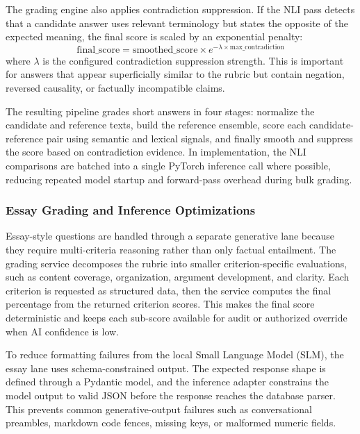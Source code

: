 The grading engine also applies contradiction suppression. If the NLI pass detects that a candidate answer uses relevant terminology but states the opposite of the expected meaning, the final score is scaled by an exponential penalty:
\[
\text{final\_score} =
\text{smoothed\_score} \times
e^{-\lambda \times \text{max\_contradiction}}
\]
where \(\lambda\) is the configured contradiction suppression strength. This is important for answers that appear superficially similar to the rubric but contain negation, reversed causality, or factually incompatible claims.

The resulting pipeline grades short answers in four stages: normalize the candidate and reference texts, build the reference ensemble, score each candidate-reference pair using semantic and lexical signals, and finally smooth and suppress the score based on contradiction evidence. In implementation, the NLI comparisons are batched into a single PyTorch inference call where possible, reducing repeated model startup and forward-pass overhead during bulk grading.

\subsubsection{Essay Grading and Inference Optimizations}
Essay-style questions are handled through a separate generative lane because they require multi-criteria reasoning rather than only factual entailment. The grading service decomposes the rubric into smaller criterion-specific evaluations, such as content coverage, organization, argument development, and clarity. Each criterion is requested as structured data, then the service computes the final percentage from the returned criterion scores. This makes the final score deterministic and keeps each sub-score available for audit or authorized override when AI confidence is low.

To reduce formatting failures from the local Small Language Model (SLM), the essay lane uses schema-constrained output. The expected response shape is defined through a Pydantic model, and the inference adapter constrains the model output to valid JSON before the response reaches the database parser. This prevents common generative-output failures such as conversational preambles, markdown code fences, missing keys, or malformed numeric fields.

